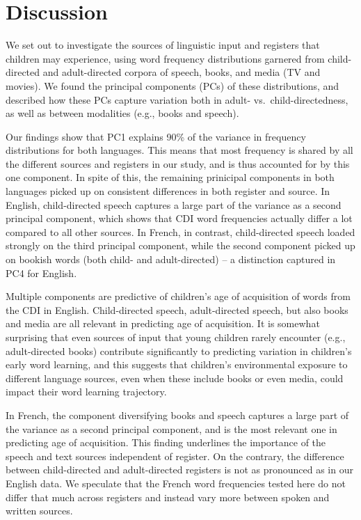 \documentclass[10pt, letterpaper]{article}
\begin{document}
\hypertarget{discussion}{%
\section{Discussion}\label{discussion}}

We set out to investigate the sources of linguistic input and registers
that children may experience, using word frequency distributions
garnered from child-directed and adult-directed corpora of speech,
books, and media (TV and movies). We found the principal components
(PCs) of these distributions, and described how these PCs capture
variation both in adult- vs.~child-directedness, as well as between
modalities (e.g., books and speech).

Our findings show that PC1 explains 90\% of the variance in frequency
distributions for both languages. This means that most frequency is
shared by all the different sources and registers in our study, and is
thus accounted for by this one component. In spite of this, the
remaining prinicipal components in both languages picked up on
consistent differences in both register and source. In English,
child-directed speech captures a large part of the variance as a second
principal component, which shows that CDI word frequencies actually
differ a lot compared to all other sources. In French, in contrast,
child-directed speech loaded strongly on the third principal component,
while the second component picked up on bookish words (both child- and
adult-directed) -- a distinction captured in PC4 for English.

Multiple components are predictive of children's age of acquisition of
words from the CDI in English. Child-directed speech, adult-directed
speech, but also books and media are all relevant in predicting age of
acquisition. It is somewhat surprising that even sources of input that
young children rarely encounter (e.g., adult-directed books) contribute
significantly to predicting variation in children's early word learning,
and this suggests that children's environmental exposure to different
language sources, even when these include books or even media, could
impact their word learning trajectory.

In French, the component diversifying books and speech captures a large
part of the variance as a second principal component, and is the most
relevant one in predicting age of acquisition. This finding underlines
the importance of the speech and text sources independent of register.
On the contrary, the difference between child-directed and
adult-directed registers is not as pronounced as in our English data. We
speculate that the French word frequencies tested here do not differ
that much across registers and instead vary more between spoken and
written sources.
\end{document}
